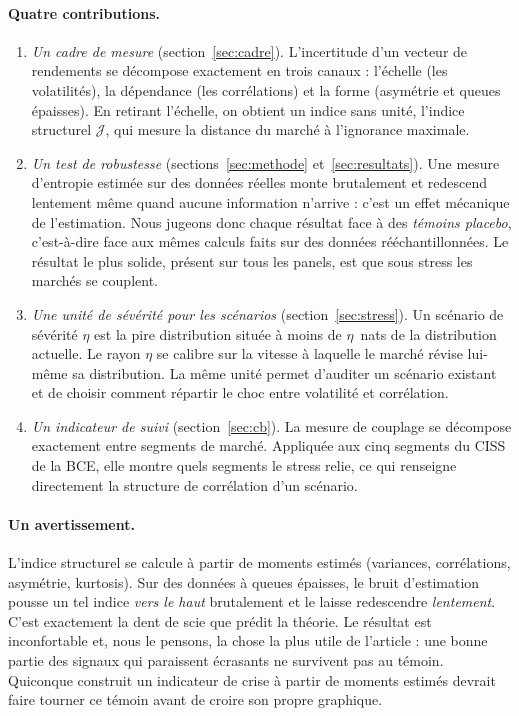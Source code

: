 \documentclass[11pt]{article}
\theoremstyle{definition}
\newcommand{\JJ}{\mathcal{J}}
\begin{document}
\paragraph{Quatre contributions.}
\begin{enumerate}
\item \emph{Un cadre de mesure} (section~\ref{sec:cadre}). L'incertitude d'un
vecteur de rendements se décompose exactement en trois canaux : l'échelle (les
volatilités), la dépendance (les corrélations) et la forme (asymétrie et queues
épaisses). En retirant l'échelle, on obtient un indice sans unité, l'indice
structurel $\JJ$, qui mesure la distance du marché à l'ignorance maximale.
\item \emph{Un test de robustesse} (sections~\ref{sec:methode}
et~\ref{sec:resultats}). Une mesure d'entropie estimée sur des données réelles
monte brutalement et redescend lentement même quand aucune information
n'arrive : c'est un effet mécanique de l'estimation. Nous jugeons donc chaque
résultat face à des \emph{témoins placebo}, c'est-à-dire face aux mêmes
calculs faits sur des données rééchantillonnées. Le résultat le plus
solide, présent sur tous les panels, est que sous stress les marchés se
couplent.
\item \emph{Une unité de sévérité pour les scénarios} (section~\ref{sec:stress}).
Un scénario de sévérité $\eta$ est la pire distribution située à moins de
$\eta$~nats de la distribution actuelle. Le rayon $\eta$ se calibre sur la
vitesse à laquelle le marché révise lui-même sa distribution. La même unité
permet d'auditer un scénario existant et de choisir comment répartir le choc
entre volatilité et corrélation.
\item \emph{Un indicateur de suivi} (section~\ref{sec:cb}). La mesure de
couplage se décompose exactement entre segments de marché. Appliquée aux cinq
segments du CISS de la BCE, elle montre quels segments le stress relie, ce qui
renseigne directement la structure de corrélation d'un scénario.
\end{enumerate}

\paragraph{Un avertissement.} L'indice structurel se calcule à partir de
moments estimés (variances, corrélations, asymétrie, kurtosis). Sur des données
à queues épaisses, le bruit d'estimation pousse un tel indice \emph{vers le
haut} brutalement et le laisse redescendre \emph{lentement}. C'est exactement la
dent de scie que prédit la théorie. Le résultat est inconfortable et, nous le
pensons, la chose la plus utile de l'article : une bonne partie des signaux
qui paraissent écrasants ne survivent pas au témoin. Quiconque construit un
indicateur de crise à partir de moments estimés devrait faire tourner ce témoin
avant de croire son propre graphique.
\end{document}
